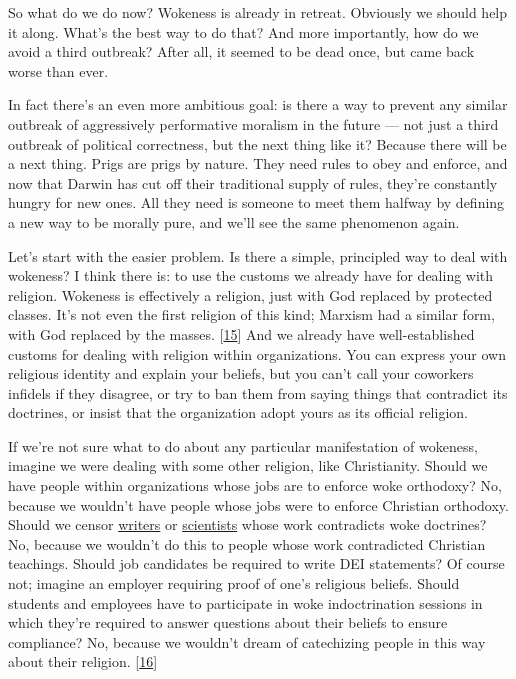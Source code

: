 So what do we do now? Wokeness is already in retreat. Obviously we
should help it along. What's the best way to do that? And more
importantly, how do we avoid a third outbreak? After all, it seemed to
be dead once, but came back worse than ever.

In fact there's an even more ambitious goal: is there a way to prevent
any similar outbreak of aggressively performative moralism in the future
--- not just a third outbreak of political correctness, but the next
thing like it? Because there will be a next thing. Prigs are prigs by
nature. They need rules to obey and enforce, and now that Darwin has cut
off their traditional supply of rules, they're constantly hungry for new
ones. All they need is someone to meet them halfway by defining a new
way to be morally pure, and we'll see the same phenomenon again.

Let's start with the easier problem. Is there a simple, principled way
to deal with wokeness? I think there is: to use the customs we already
have for dealing with religion. Wokeness is effectively a religion, just
with God replaced by protected classes. It's not even the first religion
of this kind; Marxism had a similar form, with God replaced by the
masses. {[}\hyperref[f15n]{15}{]} And we already have well-established
customs for dealing with religion within organizations. You can express
your own religious identity and explain your beliefs, but you can't call
your coworkers infidels if they disagree, or try to ban them from saying
things that contradict its doctrines, or insist that the organization
adopt yours as its official religion.

If we're not sure what to do about any particular manifestation of
wokeness, imagine we were dealing with some other religion, like
Christianity. Should we have people within organizations whose jobs are
to enforce woke orthodoxy? No, because we wouldn't have people whose
jobs were to enforce Christian orthodoxy. Should we censor
\href{https://www.telegraph.co.uk/news/2023/02/17/roald-dahl-books-rewritten-offensive-matilda-witches-twits/}{writers}
or
\href{https://x.com/KoustaStavroula/status/1562034502897106946}{scientists}
whose work contradicts woke doctrines? No, because we wouldn't do this
to people whose work contradicted Christian teachings. Should job
candidates be required to write DEI statements? Of course not; imagine
an employer requiring proof of one's religious beliefs. Should students
and employees have to participate in woke indoctrination sessions in
which they're required to answer questions about their beliefs to ensure
compliance? No, because we wouldn't dream of catechizing people in this
way about their religion. {[}\hyperref[f16n]{16}{]}

